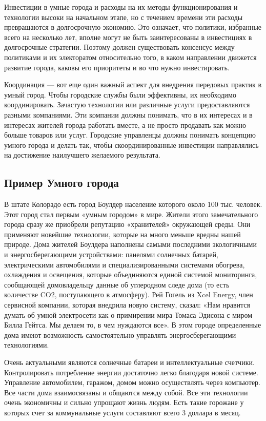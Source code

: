 Инвестиции в умные города и расходы на их методы функционирования и технологии высоки на начальном этапе, но с течением времени эти расходы превращаются в долгосрочную экономию. Это означает, что политики, избранные всего на несколько лет, вполне могут не быть заинтересованы в инвестициях в долгосрочные стратегии. Поэтому должен существовать консенсус между политиками и их электоратом относительно того, в каком направлении движется развитие города, каковы его приоритеты и во что нужно инвестировать.\cite{Innoprom}

Координация — вот еще один важный аспект для внедрения передовых практик в умный город. Чтобы городские службы были эффективны, их необходимо координировать. Зачастую технологии или различные услуги предоставляются разными компаниями. Эти компании должны понимать, что в их интересах и в интересах жителей города работать вместе, а не просто продавать как можно больше товаров или услуг. Городские управленцы должны понимать концепцию умного города и делать так, чтобы скоординированные инвестиции направлялись на достижение наилучшего желаемого результата.


\subsection{Пример Умного города}

В штате Колорадо есть город Боулдер население которого около 100 тыс. человек. Этот город стал первым «умным городом» в мире. Жители этого замечательного города сразу же приобрели репутацию «хранителей» окружающей среды. Они применяют новейшие технологии, которые на много меньше вредны нашей природе. Дома жителей Боулдера наполнены самыми последними экологичными и энергосберегающими устройствами: панелями солнечных батарей, электрическими автомобилями и специализированными системами обогрева, охлаждения и освещения, которые объединяются единой системой мониторинга, сообщающей домовладельцу данные об углеродном следе дома (то есть количестве CO2, поступающего в атмосферу). Рей Гогель из Xcel Energy, член сервисной компании, которая внедрила новую систему, сказал: «Нам нравится думать об умной электросети как о примирении мира Томаса Эдисона с миром Билла Гейтса. Мы делаем то, в чем нуждаются все». В этом городе определенные дома имеют возможность самостоятельно управлять энергосберегающими технологиями. 

Очень актуальными являются солнечные батареи и интеллектуальные счетчики. Контролировать потребление энергии достаточно легко благодаря новой системе. Управление автомобилем, гаражом, домом можно осуществлять через компьютер. Все части дома взаимосвязаны и общаются между собой. Все эти технологии очень экономичны и сильно упрощают жизнь людям. Есть такие горожане у которых счет за коммунальные услуги составляют всего 3 доллара в месяц. 

